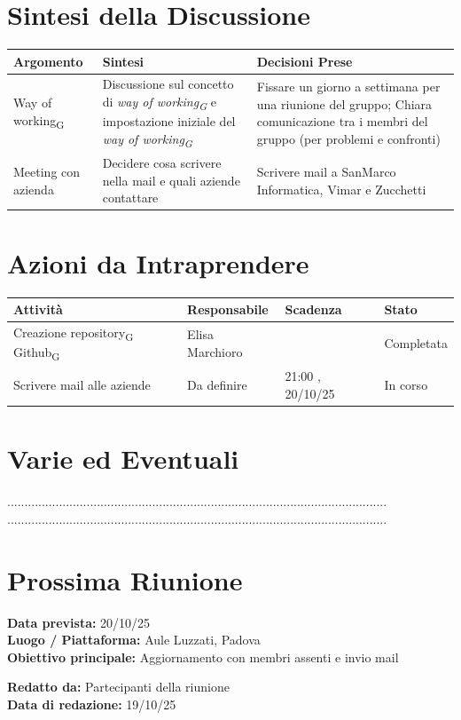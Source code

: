 \documentclass[a4paper,12pt]{article}
\newcommand{\gls}[1]{#1\textsubscript{G}}
\begin{document}
\section*{ Sintesi della Discussione}

\begin{longtable}{|p{}|p{}|p{}|}
\hline
\textbf{Argomento} & \textbf{Sintesi} & \textbf{Decisioni Prese} \\ \hline
\gls{Way of working} & Discussione sul concetto di \textit{\gls{way of working}} e impostazione iniziale del \textit{\gls{way of working}}& Fissare un giorno a settimana per una riunione del gruppo; Chiara comunicazione tra i membri del gruppo (per problemi e confronti) \\ \hline
 Meeting con azienda & Decidere cosa scrivere nella mail e quali aziende contattare & Scrivere mail a SanMarco Informatica, Vimar e Zucchetti \\ \hline
\end{longtable}


\section*{ Azioni da Intraprendere}

\begin{longtable}{|p{}|p{}|p{}|p{}|}
\hline
\textbf{Attività} & \textbf{Responsabile} & \textbf{Scadenza} & \textbf{Stato} \\ \hline
Creazione \gls{repository} \gls{Github} &  Elisa Marchioro &  & Completata \\ \hline
 Scrivere mail alle aziende & Da definire & 21:00 , 20/10/25 &  In corso\\ \hline
\end{longtable}


\section*{ Varie ed Eventuali}
..............................................................................................................\\
..............................................................................................................


\section*{ Prossima Riunione}
\textbf{Data prevista:} 20/10/25 \\
\textbf{Luogo / Piattaforma:} Aule Luzzati, Padova \\
\textbf{Obiettivo principale:} Aggiornamento con membri assenti e invio mail


\textbf{Redatto da:} Partecipanti della riunione \\
\textbf{Data di redazione:} 19/10/25
\end{document}
